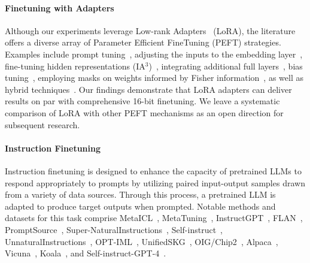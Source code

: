\paragraph{Finetuning with Adapters} Although our experiments leverage Low-rank Adapters~\citep{hu2021lora} (LoRA), the literature offers a diverse array of Parameter Efficient FineTuning (PEFT) strategies. Examples include prompt tuning~\citep{qin2021learning,lester2021power,li2021prefix}, adjusting the inputs to the embedding layer~\citep{an2022input}, fine-tuning hidden representations (IA$^3$)~\citep{liu2022few}, integrating additional full layers~\citep{houlsby2019parameter}, bias tuning~\citep{zaken2021bitfit}, employing masks on weights informed by Fisher information~\citep{sung2021training}, as well as hybrid techniques~\citep{henderson2021compacter}. Our findings demonstrate that LoRA adapters can deliver results on par with comprehensive 16-bit finetuning. We leave a systematic comparison of LoRA with other PEFT mechanisms as an open direction for subsequent research.

\paragraph{Instruction Finetuning} Instruction finetuning is designed to enhance the capacity of pretrained LLMs to respond appropriately to prompts by utilizing paired input-output samples drawn from a variety of data sources. Through this process, a pretrained LLM is adapted to produce target outputs when prompted. Notable methods and datasets for this task comprise MetaICL~\citep{min2021metaicl}, MetaTuning~\citep{zhong2021adapting}, InstructGPT~\citep{ouyang2022training}, FLAN~\citep{wei2021finetuned,chung2022scaling}, PromptSource~\citep{bach2022promptsource}, Super-NaturalInstructions~\citep{wang2022super,sanh2021multitask}, Self-instruct~\citep{wang2022self}, UnnaturalInstructions~\citep{honovich2022unnatural}, OPT-IML~\citep{iyer2022opt}, UnifiedSKG~\citep{xie2022unifiedskg}, OIG/Chip2~\citep{laion2023}, Alpaca~\citep{alpaca}, Vicuna~\citep{vicuna2023}, Koala~\citep{koala_blogpost_2023}, and Self-instruct-GPT-4~\citep{peng2023instruction}.


